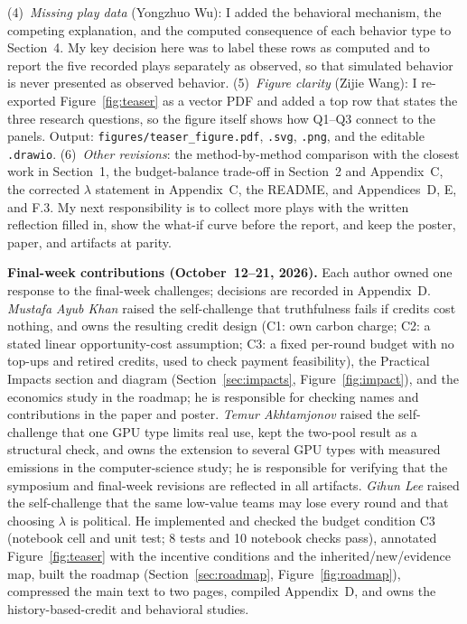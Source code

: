 (4)~\emph{Missing play data} (Yongzhuo Wu): I added the behavioral mechanism, the competing explanation, and the computed consequence of each behavior type to Section~4. My key decision here was to label these rows as computed and to report the five recorded plays separately as observed, so that simulated behavior is never presented as observed behavior.
(5)~\emph{Figure clarity} (Zijie Wang): I re-exported Figure~\ref{fig:teaser} as a vector PDF and added a top row that states the three research questions, so the figure itself shows how Q1--Q3 connect to the panels. Output: \texttt{figures/teaser\_figure.pdf}, \texttt{.svg}, \texttt{.png}, and the editable \texttt{.drawio}.
(6)~\emph{Other revisions}: the method-by-method comparison with the closest work in Section~1, the budget-balance trade-off in Section~2 and Appendix~C, the corrected $\lambda$ statement in Appendix~C, the README, and Appendices~D, E, and F.3. My next responsibility is to collect more plays with the written reflection filled in, show the what-if curve before the report, and keep the poster, paper, and artifacts at parity.

\textbf{Final-week contributions (October~12--21, 2026).} Each author owned one response to the final-week challenges; decisions are recorded in Appendix~D.
\emph{Mustafa Ayub Khan} raised the self-challenge that truthfulness fails if credits cost nothing, and owns the resulting credit design (C1: own carbon charge; C2: a stated linear opportunity-cost assumption; C3: a fixed per-round budget with no top-ups and retired credits, used to check payment feasibility), the Practical Impacts section and diagram (Section~\ref{sec:impacts}, Figure~\ref{fig:impact}), and the economics study in the roadmap; he is responsible for checking names and contributions in the paper and poster.
\emph{Temur Akhtamjonov} raised the self-challenge that one GPU type limits real use, kept the two-pool result as a structural check, and owns the extension to several GPU types with measured emissions in the computer-science study; he is responsible for verifying that the symposium and final-week revisions are reflected in all artifacts.
\emph{Gihun Lee} raised the self-challenge that the same low-value teams may lose every round and that choosing $\lambda$ is political. He implemented and checked the budget condition C3 (notebook cell and unit test; 8 tests and 10 notebook checks pass), annotated Figure~\ref{fig:teaser} with the incentive conditions and the inherited/new/evidence map, built the roadmap (Section~\ref{sec:roadmap}, Figure~\ref{fig:roadmap}), compressed the main text to two pages, compiled Appendix~D, and owns the history-based-credit and behavioral studies.

